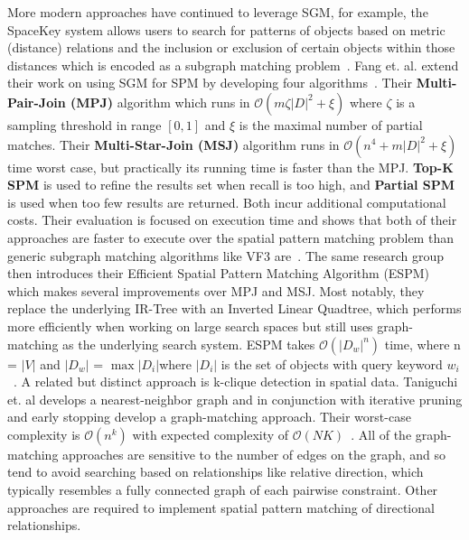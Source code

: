 \par{
    More modern approaches have continued to leverage SGM, for example, the SpaceKey system allows users to search for patterns of objects based on metric (distance) relations and the inclusion or exclusion of certain objects within those distances which is encoded as a subgraph matching problem~\cite{Fang2018}.
    Fang et. al. extend their work on using SGM for SPM by developing four algorithms~\cite{Fang2019}. 
    Their \textbf{Multi-Pair-Join (MPJ)} algorithm which runs in $\mathcal{O}(m\zeta |D|^2+\xi)$ where $\zeta$ is a sampling threshold in range $[0,1]$ and $\xi$ is the maximal number of partial matches. 
    Their \textbf{Multi-Star-Join (MSJ)} algorithm runs in $\mathcal{O}(n^4+m|D|^2+\xi)$ time worst case, but practically its running time is faster than the MPJ. 
    \textbf{Top-K SPM} is used to refine the results set when recall is too high, and \textbf{Partial SPM} is used when too few results are returned. 
    Both incur additional computational costs. 
    Their evaluation is focused on execution time and shows that both of their approaches are faster to execute over the spatial pattern matching problem than generic subgraph matching algorithms like VF3 are~\cite{Fang2019}.
    The same research group then introduces their Efficient Spatial Pattern Matching Algorithm (ESPM) which makes several improvements over MPJ and MSJ. 
    Most notably, they replace the underlying IR-Tree with an Inverted Linear Quadtree, which performs more efficiently when working on large search spaces but still uses graph-matching as the underlying search system. 
    ESPM takes $\mathcal{O}(|D_w|^n)$ time, where n = $|V|$ and $|D_w|$ = $\max{|D_i|}$where $|D_i|$ is the set of objects with query keyword $w_i$~\cite{Chen2019}.
    A related but distinct approach is k-clique detection in spatial data. 
    Taniguchi et. al develops a nearest-neighbor graph and in conjunction with iterative pruning and early stopping develop a graph-matching approach. Their worst-case complexity is $\mathcal{O}(n^k)$ with expected complexity of $\mathcal{O}(NK)$~\cite{Taniguchi2022}.
    All of the graph-matching approaches are sensitive to the number of edges on the graph, and so tend to avoid searching based on relationships like relative direction, which typically resembles a fully connected graph of each pairwise constraint. 
    Other approaches are required to implement spatial pattern matching of directional relationships.
    }   

